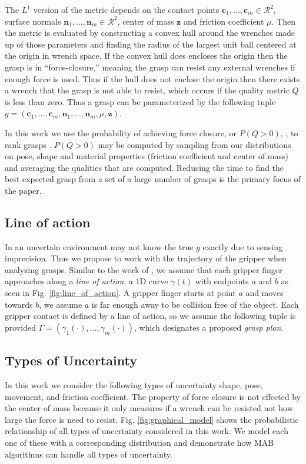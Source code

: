 \documentclass[letterpaper, 10 pt, conference]{ieeeconf}  %
\begin{document}
The $L^1$ version of the metric depends on the contact points $\textbf{c}_1,...,\textbf{c}_m \in \mathcal{R}^2$, surface normals $\textbf{n}_1,...,\textbf{n}_m \in \mathcal{R}^2$, center of mass $\textbf{z}$ and friction coefficient $\mu$. Then the metric is evaluated by constructing a convex hull around the wrenches made up of those parameters and finding the radius of the largest unit ball centered at the origin in wrench space. If the convex hull does encloses the origin then the grasp is in ``force-closure,'' meaning the grasp can resist any external wrenches if enough force is used. Thus if the hull does not enclose the origin then there exists a wrench that the grasp is not able to resist, which occurs if the quality metric $Q$ is less than zero. Thus a grasp can be parameterized by the following tuple $g = ( \textbf{c}_1,...,\textbf{c}_m,\textbf{n}_1,...,\textbf{n}_m,\mu, \textbf{z} )$.

In this work we use the probability of achieving force closure, or $P(Q>0)$, \cite{christopoulos2007handling}\cite{kehoe2012toward}, to rank grasps . $P(Q>0)$ may be computed by sampling from our distributions on pose, shape and material properties (friction coefficient and center of mass) and averaging the qualities that are computed. Reducing the time to find the best expected grasp from a set of a large number of grasps is the primary focus of the paper. 

\subsection{Line of action}
In an uncertain environment may not know the true $g$ exactly due to sensing imprecision. Thus we propose to work with the trajectory of the gripper when analyzing grasps. Similar to the work of \cite{christopoulos2007handling}, we assume that each gripper finger approaches along a \textit{line of action}, a 1D curve $\gamma(t)$ with endpoints $a$ and $b$ as seen in Fig. \ref{fig:line_of_action}.
A gripper finger starts at point $a$ and moves towards $b$, we assume $a$ is far enough away to be collision free of the object.
Each gripper contact is defined by a line of action, so we assume the following tuple is provided $\Gamma = ( \gamma_1(\cdot),...,\gamma_m(\cdot) )$, which designates a proposed \textit{grasp plan}.

\subsection{Types of Uncertainty}
In this work we consider the following types of uncertainty shape, pose, movement, and friction coefficient.  The property of force closure is not effected by the center of mass because it only measures if a wrench can be resisted not how large the force is need to resist.  Fig. \ref{fig:graphical_model} shows the probabilistic relationship of all types of uncertainty considered in this work. We model each one of these with a corresponding distribution and demonstrate how MAB algorithms can handle all types of uncertainty.
\end{document}

